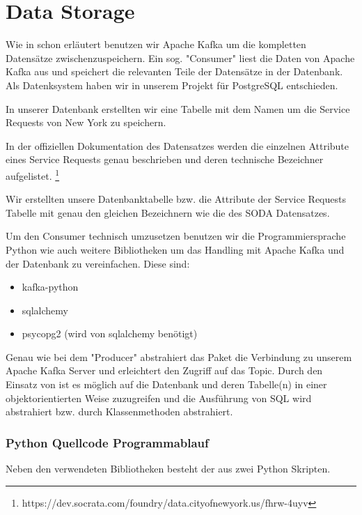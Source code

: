 \section{Data Storage}

Wie in  schon erläutert benutzen wir Apache Kafka um die kompletten Datensätze zwischenzuspeichern.
Ein sog. "Consumer" liest die Daten von Apache Kafka aus und speichert die relevanten Teile der Datensätze in der Datenbank.
Als Datenksystem haben wir in unserem Projekt für PostgreSQL entschieden.

In unserer Datenbank erstellten wir eine Tabelle mit dem Namen  um die Service Requests von New York zu speichern.

In der offiziellen Dokumentation des Datensatzes werden die einzelnen Attribute
eines Service Requests genau beschrieben und deren technische Bezeichner aufgelistet.
\footnote{https://dev.socrata.com/foundry/data.cityofnewyork.us/fhrw-4uyv}

Wir erstellten unsere Datenbanktabelle bzw. die Attribute der Service Requests Tabelle mit
genau den gleichen Bezeichnern wie die des \ac{SODA} Datensatzes.

Um den Consumer technisch umzusetzen benutzen wir die Programmiersprache Python wie auch weitere Bibliotheken um das Handling mit Apache Kafka
und der Datenbank zu vereinfachen.
Diese sind:

\begin{itemize}
  \item kafka-python
  \item sqlalchemy
  \item psycopg2 (wird von sqlalchemy benötigt)
\end{itemize}

Genau wie bei dem "Producer" abstrahiert das Paket  die Verbindung zu unserem Apache Kafka Server und erleichtert den Zugriff auf das Topic.
Durch den Einsatz von  ist es möglich auf die Datenbank und deren Tabelle(n) in einer objektorientierten Weise zuzugreifen
und die Ausführung von \ac{SQL} wird abstrahiert bzw. durch Klassenmethoden abstrahiert.

\subsubsection{Python Quellcode Programmablauf}
\label{subsub:quellcode_storage}
Neben den verwendeten Bibliotheken besteht der  aus zwei Python Skripten.

